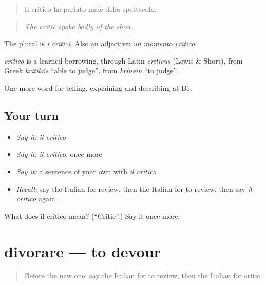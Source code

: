 \begin{quote}
Il critico ha parlato male dello spettacolo.
\end{quote}

\begin{quote}
\emph{The critic spoke badly of the show.}
\end{quote}

The plural is \emph{i critici}. Also an adjective: \emph{un momento critico}.

\begin{cousinweb}
\emph{critico} is a learned borrowing, through Latin \emph{criticus} (Lewis \& Short), from Greek \emph{kritikós} \textquotedblleft{}able to judge\textquotedblright{}, from \emph{krínein} \textquotedblleft{}to judge\textquotedblright{}.
\end{cousinweb}

\begin{grammarlens}[title={What you've built}]
One more word for telling, explaining and describing at B1.
\end{grammarlens}

\subsection*{Your turn}
\begin{itemize}
\raggedright
  \item \emph{Say it:} \emph{il critico}
  \item \emph{Say it:} \emph{il critico}, once more
  \item \emph{Say it:} a sentence of your own with \emph{il critico}
  \item \emph{Recall:} say the Italian for review, then the Italian for to review, then say \emph{il critico} again
\end{itemize}

\begin{tcolorbox}[breakable,colback=teal!4,colframe=teal!35!black,title={Before you move on}]
What does il critico mean? (\textquotedblleft{}Critic\textquotedblright{}.) Say it once more.
\end{tcolorbox}
\section[divorare]{divorare — to devour}

\label{lesson:IT-C526-divorare}



\begin{quote}
Before the new one: say the Italian for to review, then the Italian for critic.
\end{quote}

